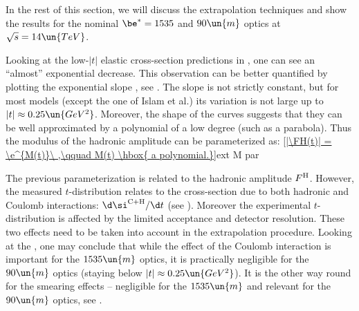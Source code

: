 In the rest of this section, we will discuss the extrapolation techniques and show the results for the nominal $\be^* = 1535$ and $90\un{m}$ optics at $\sqrt s = 14\un{TeV}$.

Looking at the low-$|t|$ elastic cross-section predictions in , one can see an ``almost'' exponential decrease. This observation can be better quantified by plotting the exponential slope , see . The slope is not strictly constant, but for most models (except the one of Islam et al.) its variation is not large up to $|t| \approx 0.25\un{GeV^2}$. Moreover, the shape of the curves suggests that they can be well approximated by a polynomial of a low degree (such as a parabola). Thus the modulus of the hadronic amplitude can be parameterized as:
\eqref{|\FH(t)| = \e^{M(t)}\ ,\qquad M(t) \hbox{ a polynomial.}}{ext M par}


The previous parameterization is related to the hadronic amplitude $F^{\rm H}$. However, the measured $t$-distribution relates to the cross-section due to both hadronic and Coulomb interactions: $\d\si^{\rm C+H}/\d t$ (see ). Moreover the experimental $t$-distribution is affected by the limited acceptance and detector resolution. These two effects need to be taken into account in the extrapolation procedure. Looking at the , one may conclude that while the effect of the Coulomb interaction is important for the $1535\un{m}$ optics, it is practically negligible for the $90\un{m}$ optics (staying below $|t| \approx 0.25\un{GeV^2}$). It is the other way round for the smearing effects -- negligible for the $1535\un{m}$ and relevant for the $90\un{m}$ optics, see .

\bmfig
{}
\emfig

